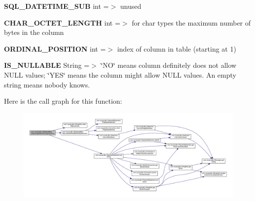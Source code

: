 \begin{DoxyEnumerate}
\item {\bfseries S\+Q\+L\+\_\+\+D\+A\+T\+E\+T\+I\+M\+E\+\_\+\+S\+UB} int =$>$ unused 
\item {\bfseries C\+H\+A\+R\+\_\+\+O\+C\+T\+E\+T\+\_\+\+L\+E\+N\+G\+TH} int =$>$ for char types the maximum number of bytes in the column 
\item {\bfseries O\+R\+D\+I\+N\+A\+L\+\_\+\+P\+O\+S\+I\+T\+I\+ON} int =$>$ index of column in table (starting at 1) 
\item {\bfseries I\+S\+\_\+\+N\+U\+L\+L\+A\+B\+LE} String =$>$ \char`\"{}\+N\+O\char`\"{} means column definitely does not allow N\+U\+LL values; \char`\"{}\+Y\+E\+S\char`\"{} means the column might allow N\+U\+LL values. An empty string means nobody knows. 
\end{DoxyEnumerate}Here is the call graph for this function\+:
\nopagebreak
\begin{figure}[H]
\begin{center}
\leavevmode
\includegraphics[width=350pt]{classcom_1_1mysql_1_1jdbc_1_1_database_meta_data_using_info_schema_a32e04e3285884390a2cfd25bfb1fc544_cgraph}
\end{center}
\end{figure}
\mbox{\label{classcom_1_1mysql_1_1jdbc_1_1_database_meta_data_using_info_schema_a720ac1db468802b830153fb7300155d8}} 
